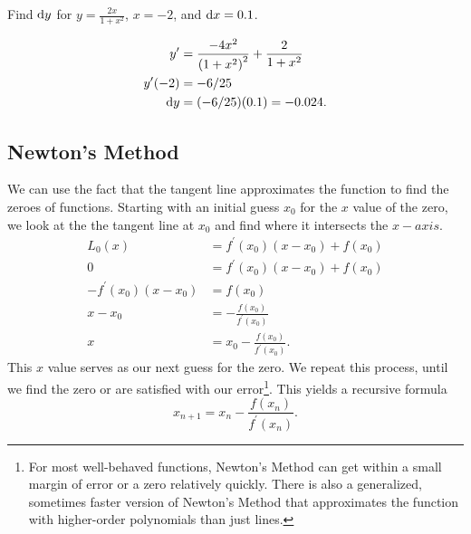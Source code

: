 \begin{example}
	Find $\mathrm{d} y$ for $y=\frac{2x}{1+x^2}$, $x=-2$, and $\mathrm{d} x = 0.1$.
\end{example}
\begin{align*}
	y^\prime &= \frac{-4x^2}{\left(1+x^2\right)^2} + \frac{2}{1+x^2} \\
	y^\prime(-2) &= -6/25 \\
	\mathrm{d} y &= (-6/25)(0.1) = -0.024.
\end{align*}

\subsection{Newton's Method}
We can use the fact that the tangent line approximates the function to find the zeroes of functions.
Starting with an initial guess $x_0$ for the $x$ value of the zero, we look at the the tangent line at $x_0$ and find where it intersects the $x-axis$.
\begin{align*}
	L_0(x) &= f^\prime(x_0)(x - x_0) + f(x_0) \\
	0 &= f^\prime(x_0)(x - x_0) + f(x_0) \\
	-f^\prime(x_0)(x - x_0) &= f(x_0) \\
	x - x_0 &= -\frac{f(x_0)}{f^\prime(x_0)} \\
	x &= x_0 - \frac{f(x_0)}{f^\prime(x_0)}.
\end{align*}
This $x$ value serves as our next guess for the zero.
We repeat this process, until we find the zero or are satisfied with our error\footnote{For most well-behaved functions, Newton's Method can get within a small margin of error or a zero relatively quickly. There is also a generalized, sometimes faster version of Newton's Method that approximates the function with higher-order polynomials than just lines.}.
This yields a recursive formula
\begin{equation*}
	x_{n+1} = x_n - \frac{f(x_n)}{f^\prime(x_n)}.
\end{equation*}